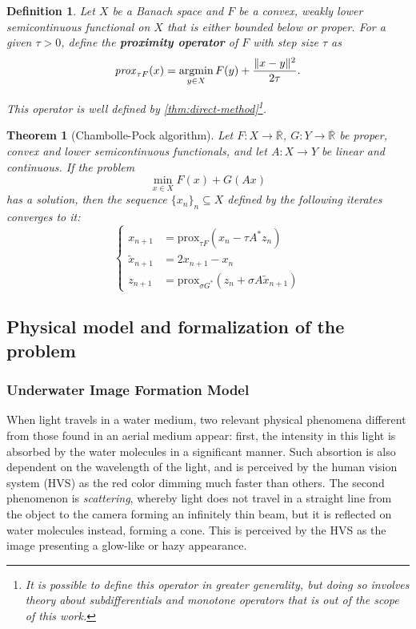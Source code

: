 \documentclass[twocolumn,twoside,a4paper,10pt]{IEEEtran}
\newtheorem{definition}{Definition}
\newtheorem{theorem}{Theorem}
\DeclareMathOperator*{\argmin}{\operatorname*{argmin}}
\DeclareMathOperator*{\argmin}{arg\,min}
\begin{document}
\begin{definition}
  Let \(X\) be a Banach space and \(F\) be a convex, weakly lower semicontinuous functional on \(X\) that is either bounded below or proper. For a given \(\tau>0\), define the \textbf{proximity operator} of \(F\) with step size \(\tau\) as
  \[
    \text{\emph{prox}}_{\tau F}(x) = \argmin_{y\in X}F(y) + \frac{\|x-y\|^2}{2\tau}
  .\]

  This operator is well defined by \cref{thm:direct-method}\footnote{It is possible to define this operator in greater generality, but doing so involves theory about subdifferentials and monotone operators that is out of the scope of this work.}.
\end{definition}

\begin{theorem}[Chambolle-Pock algorithm]\label{thm:chambolle-pock}
  Let \(F\colon X\to\overline{\mathbb{R}}\), \(G\colon Y\to\overline{\mathbb{R}}\) be proper, convex and lower semicontinuous functionals, and let \(A\colon X\to Y\) be linear and continuous. If the problem
  \[
    \min_{x\in X}F(x) + G(Ax)
  \]
  has a solution, then the sequence \(\{x_n\}_n\subseteq X\) defined by the following iterates converges to it:
  \begin{equation}\label{eq:iterates}
    \left\{
    \begin{split}
      x_{n+1} & = \text{prox}_{\tau F}(x_n - \tau A^*z_n) \\
      \tilde{x}_{n+1} & = 2x_{n+1} - x_n \\
      z_{n+1} & = \text{prox}_{\sigma G^*}(z_n + \sigma A\tilde{x}_{n+1})
    \end{split}
    \right.
  \end{equation}
\end{theorem}

\subsection{Physical model and formalization of the problem} \label{subsec:physical-model}
\subsubsection{Underwater Image Formation Model}
When light travels in a water medium, two relevant physical phenomena different from those found in an aerial medium appear: first, the intensity in this light
is absorbed by the water molecules in a significant manner. Such absortion is
also dependent on the wavelength of the light, and is perceived by the human vision system (HVS) as 
the red color dimming much faster than others. The second phenomenon is
\textit{scattering}, whereby light does not travel in a straight line from the
object to the camera forming an infinitely thin beam, but it is reflected on water molecules instead, forming a cone. This is perceived by the HVS as the image
presenting a glow-like or hazy appearance.
\end{document}
